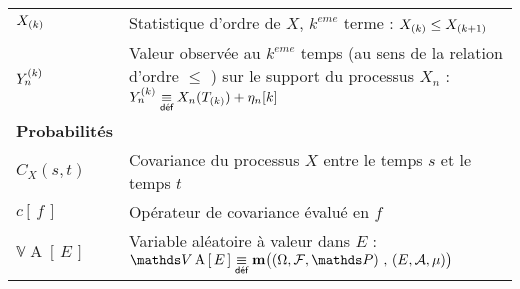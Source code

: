 \begin{table}[H]
\begin{tabularx}{\textwidth}{lX}
		$\ordered X k$                                                   & Statistique d'ordre de $X$, $k^{eme}$ terme : $\ordered X {k} \leq \ordered X {k+1}$                                                                                                                                              \\
		$\statrang Y n {k}$                                              & Valeur observée au $k^{eme}$ temps (au sens de la relation d'ordre $\leq$ ) sur le support du processus $X_n$ : $\statrang Y n k \isdef X_n( \ordered T k ) + \eta_{n}[k]$                                             \\
		\midrule
		\textbf{Probabilités}                                            &                                                                                                                                                                                                                                   \\
		\midrule
		$C_X (s,t)$                                                      & Covariance du processus $X$ entre le temps $s$ et le temps $t$                                                                                                                                                                    \\
		$c\left[ \, f \, \right]$                                        & Opérateur de covariance évalué en $f$                                                                                                                                                                                             \\
		$\mathds V \operatorname{A}\left[ \, E \,\right]$               & Variable aléatoire à valeur dans $E$ : $\mathds V \operatorname{A}\left[ \, E \,\right] \isdef \mathbf m\bigl( \left(\Omega, \mathcal F, \mathds P\right) \, , \, \left(E, \mathcal A, \mu\right) \bigr)$                        \\
		\bottomrule
	\end{tabularx}
\end{table}


